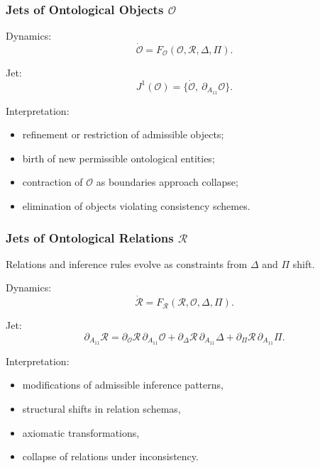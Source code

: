 \subsubsection{Jets of Ontological Objects $\mathcal{O}$}

Dynamics:
\[
\dot{\mathcal{O}}
=
F_{\mathcal{O}}(\mathcal{O},\mathcal{R},\Delta,\Pi).
\]

Jet:
\[
J^1(\mathcal{O})=\{\dot{\mathcal{O}},\ \partial_{A_{11}}\mathcal{O}\}.
\]

Interpretation:
\begin{itemize}
    \item refinement or restriction of admissible objects;
    \item birth of new permissible ontological entities;
    \item contraction of $\mathcal{O}$ as boundaries approach collapse;
    \item elimination of objects violating consistency schemes.
\end{itemize}


\subsubsection{Jets of Ontological Relations $\mathcal{R}$}

Relations and inference rules evolve as constraints from
$\Delta$ and $\Pi$ shift.

Dynamics:
\[
\dot{\mathcal{R}}
=
F_{\mathcal{R}}(\mathcal{R},\mathcal{O},\Delta,\Pi).
\]

Jet:
\[
\partial_{A_{11}}\mathcal{R}
=
\partial_{\mathcal{O}}\mathcal{R}\,\partial_{A_{11}}\mathcal{O}
+
\partial_{\Delta}\mathcal{R}\,\partial_{A_{11}}\Delta
+
\partial_{\Pi}\mathcal{R}\,\partial_{A_{11}}\Pi.
\]

Interpretation:
\begin{itemize}
    \item modifications of admissible inference patterns,
    \item structural shifts in relation schemas,
    \item axiomatic transformations,
    \item collapse of relations under inconsistency.
\end{itemize}


